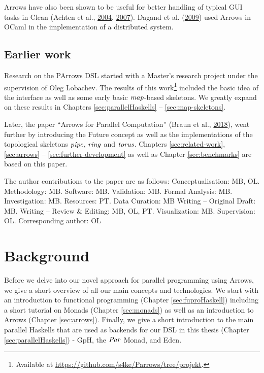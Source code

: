 \documentclass[paper=A4,twoside=true,openright,parskip=full,chapterprefix=true,headings=normal,bibliography=totoc,listof=totoc,titlepage=on,captions=tableabove,draft=false,british]{scrreprt}%
\renewcommand{\enquote}[1]{{``}#1{''}}
\begin{document}
Arrows have also been shown to be useful for better handling of typical
GUI tasks in Clean (Achten et al.,
\protect\hyperlink{ref-achten2004arrows}{2004},
\protect\hyperlink{ref-achten2007arrow}{2007}). Dagand et al.
(\protect\hyperlink{ref-Dagand:2009:ORD:1481861.1481870}{2009}) used
Arrows in OCaml in the implementation of a distributed system.

\hypertarget{earlier-work}{%
\section{Earlier work}\label{earlier-work}}

\label{sec:earlierwork}

Research on the PArrows DSL started with a Master's research project
under the supervision of Oleg Lobachev. The
results of this work\footnote{Available at \url{https://github.com/s4ke/Parrows/tree/projekt}.} included the basic idea of the interface as well as
some early basic \ensuremath{\Varid{map}}-based skeletons. We greatly expand on these
results in Chapters \ref{sec:parallelHaskells} --
\ref{sec:map-skeletons}.

Later, the paper \enquote{Arrows for Parallel Computation} (Braun et
al., \protect\hyperlink{ref-PArrowsPaper}{2018}), went further by
introducing the Future concept as well as the implementations of the
topological skeletons \ensuremath{\Varid{pipe}}, \ensuremath{\Varid{ring}} and \ensuremath{\Varid{torus}}. Chapters
\ref{sec:related-work}, \ref{sec:arrows} --
\ref{sec:further-development} as well as Chapter \ref{sec:benchmarks}
are based on this paper.

The author contributions to the paper are as follows: Conceptualisation:
MB, OL. Methodology: MB. Software: MB. Validation: MB. Formal Analysis:
MB. Investigation: MB. Resources: PT. Data Curation: MB Writing --
Original Draft: MB. Writing -- Review \& Editing: MB, OL, PT.
Visualization: MB. Supervision: OL. Corresponding author: OL

\hypertarget{background}{%
\chapter{Background}\label{background}}

\label{sec:background}

Before we delve into our novel approach for parallel programming using
Arrows, we give a short overview of all our main concepts and
technologies. We start with an introduction to functional programming
(Chapter \ref{sec:fuproHaskell}) including a short tutorial on Monads
(Chapter \ref{sec:monads}) as well as an introduction to Arrows (Chapter
\ref{sec:arrows}). Finally, we give a short introduction to the main
parallel Haskells that are used as backends for our DSL in this thesis
(Chapter \ref{sec:parallelHaskells}) - GpH, the \ensuremath{\Conid{Par}} Monad, and Eden.
\end{document}
